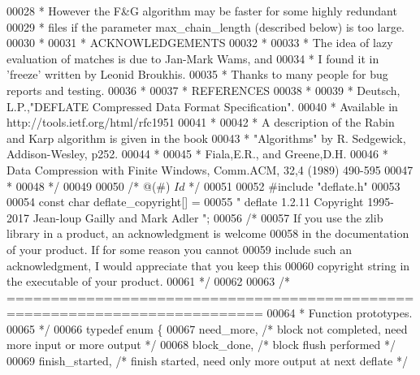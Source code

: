 \begin{DoxyCode}
00028 \textcolor{comment}{ *      However the F&G algorithm may be faster for some highly redundant}
00029 \textcolor{comment}{ *      files if the parameter max\_chain\_length (described below) is too large.}
00030 \textcolor{comment}{ *}
00031 \textcolor{comment}{ *  ACKNOWLEDGEMENTS}
00032 \textcolor{comment}{ *}
00033 \textcolor{comment}{ *      The idea of lazy evaluation of matches is due to Jan-Mark Wams, and}
00034 \textcolor{comment}{ *      I found it in 'freeze' written by Leonid Broukhis.}
00035 \textcolor{comment}{ *      Thanks to many people for bug reports and testing.}
00036 \textcolor{comment}{ *}
00037 \textcolor{comment}{ *  REFERENCES}
00038 \textcolor{comment}{ *}
00039 \textcolor{comment}{ *      Deutsch, L.P.,"DEFLATE Compressed Data Format Specification".}
00040 \textcolor{comment}{ *      Available in http://tools.ietf.org/html/rfc1951}
00041 \textcolor{comment}{ *}
00042 \textcolor{comment}{ *      A description of the Rabin and Karp algorithm is given in the book}
00043 \textcolor{comment}{ *         "Algorithms" by R. Sedgewick, Addison-Wesley, p252.}
00044 \textcolor{comment}{ *}
00045 \textcolor{comment}{ *      Fiala,E.R., and Greene,D.H.}
00046 \textcolor{comment}{ *         Data Compression with Finite Windows, Comm.ACM, 32,4 (1989) 490-595}
00047 \textcolor{comment}{ *}
00048 \textcolor{comment}{ */}
00049 
00050 \textcolor{comment}{/* @(#) $Id$ */}
00051 
00052 \textcolor{preprocessor}{#include "deflate.h"}
00053 
00054 \textcolor{keyword}{const} \textcolor{keywordtype}{char} deflate\_copyright[] =
00055    \textcolor{stringliteral}{" deflate 1.2.11 Copyright 1995-2017 Jean-loup Gailly and Mark Adler "};
00056 \textcolor{comment}{/*}
00057 \textcolor{comment}{  If you use the zlib library in a product, an acknowledgment is welcome}
00058 \textcolor{comment}{  in the documentation of your product. If for some reason you cannot}
00059 \textcolor{comment}{  include such an acknowledgment, I would appreciate that you keep this}
00060 \textcolor{comment}{  copyright string in the executable of your product.}
00061 \textcolor{comment}{ */}
00062 
00063 \textcolor{comment}{/* ===========================================================================}
00064 \textcolor{comment}{ *  Function prototypes.}
00065 \textcolor{comment}{ */}
00066 \textcolor{keyword}{typedef} \textcolor{keyword}{enum} \{
00067     need\_more,      \textcolor{comment}{/* block not completed, need more input or more output */}
00068     block\_done,     \textcolor{comment}{/* block flush performed */}
00069     finish\_started, \textcolor{comment}{/* finish started, need only more output at next deflate */}

\end{DoxyCode}
